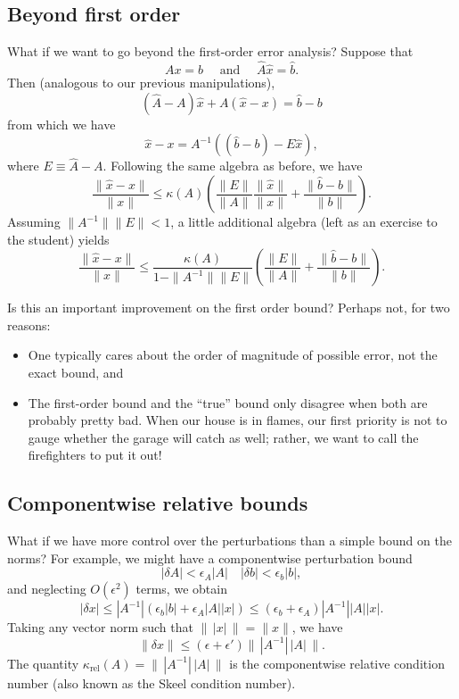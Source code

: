 \documentclass[12pt, leqno]{article} %
\begin{document}
\subsection{Beyond first order}

What if we want to go beyond the first-order error analysis?
Suppose that
\[
  Ax = b \quad \mbox{ and } \quad \hat{A} \hat{x} = \hat{b}.
\]
Then (analogous to our previous manipulations),
\[
  (\hat{A}-A) \hat{x} + A(\hat{x}-x) = \hat{b}-b
\]
from which we have
\[
  \hat{x}-x = A^{-1} \left( (\hat{b}-b) - E \hat{x} \right),
\]
where $E \equiv \hat{A}-A$.  Following the same algebra as before,
we have
\[
  \frac{\|\hat{x}-x\|}{\|x\|} \leq
  \kappa(A) \left(
    \frac{\|E\|}{\|A\|} \frac{\|\hat{x}\|}{\|x\|} +
    \frac{\|\hat{b}-b\|}{\|b\|}
  \right).
\]
Assuming $\|A^{-1}\| \|E\| < 1$, a little additional algebra
(left as an exercise to the student) yields
\[
\frac{\|\hat{x}-x\|}{\|x\|} \leq
\frac{\kappa(A)}{1-\|A^{-1}\|\|E\|} \left(
  \frac{\|E\|}{\|A\|} +
  \frac{\|\hat{b}-b\|}{\|b\|}
\right).
\]

Is this an important improvement on the first order bound?
Perhaps not, for two reasons:
\begin{itemize}
\item One typically cares about the order of magnitude of possible error,
  not the exact bound, and
\item The first-order bound and the ``true'' bound only disagree when
  both are probably pretty bad.  When our house is in flames, our first
  priority is not to gauge whether the garage will catch as well;
  rather, we want to call the firefighters to put it out!
\end{itemize}

\subsection{Componentwise relative bounds}

What if we have more control over the perturbations than a simple bound
on the norms?  For example, we might have a componentwise perturbation
bound
\[
  |\delta A| < \epsilon_A |A| \quad |\delta b| < \epsilon_b |b|,
\]
and neglecting $O(\epsilon^2)$ terms, we obtain
\[
  |\delta x|
  \leq |A^{-1}| \left( \epsilon_b |b| + \epsilon_A |A| |x| \right)
  \leq (\epsilon_b+\epsilon_A) |A^{-1}| |A| |x|.
\]
Taking any vector norm such that $\|\,|x|\,\|=\|x\|$, we have
\[
  \|\delta x\| \leq (\epsilon + \epsilon') \| \, |A^{-1}| \, |A| \, \|.
\]
The quantity
$\kappa_{\mathrm{rel}}(A) = \| \, |A^{-1}| \, |A| \, \|$ is the
componentwise relative condition number (also known as the Skeel
condition number).
\end{document}
